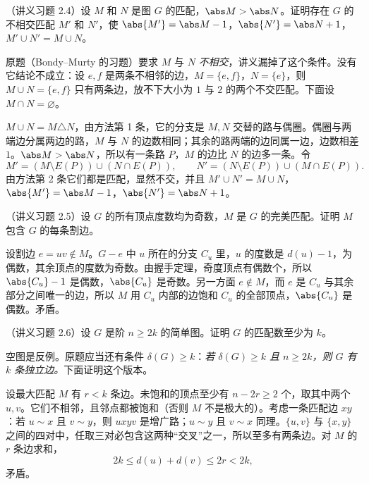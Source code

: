 \begin{workedexample}\label{we:augmenting-paths:exchange}
（讲义习题 2.4）设 $M$ 和 $N$ 是图 $G$ 的匹配，$\abs M>\abs N$。证明存在 $G$ 的不相交匹配 $M'$ 和 $N'$，使 $\abs{M'}=\abs M-1$，$\abs{N'}=\abs N+1$，$M'\cup N'=M\cup N$。
\end{workedexample}
\begin{remark}[讲义原题有误]
原题（Bondy--Murty 的习题）要求 $M$ 与 $N$ \emph{不相交}，讲义漏掉了这个条件。没有它结论不成立：设 $e,f$ 是两条不相邻的边，$M=\{e,f\}$，$N=\{e\}$，则 $M\cup N=\{e,f\}$ 只有两条边，放不下大小为 $1$ 与 $2$ 的两个不交匹配。下面设 $M\cap N=\varnothing$。
\end{remark}
\begin{solution}
$M\cup N=M\triangle N$，由方法第 1 条，它的分支是 $M,N$ 交替的路与偶圈。偶圈与两端边分属两边的路，$M$ 与 $N$ 的边数相同；其余的路两端的边同属一边，边数相差 $1$。$\abs M>\abs N$，所以有一条路 $P$，$M$ 的边比 $N$ 的边多一条。令
\[
M'=(M\setminus E(P))\cup(N\cap E(P)),\qquad N'=(N\setminus E(P))\cup(M\cap E(P)).
\]
由方法第 2 条它们都是匹配，显然不交，并且 $M'\cup N'=M\cup N$，$\abs{M'}=\abs M-1$，$\abs{N'}=\abs N+1$。
\end{solution}

\begin{workedexample}\label{we:augmenting-paths:bridges}
（讲义习题 2.5）设 $G$ 的所有顶点度数均为奇数，$M$ 是 $G$ 的完美匹配。证明 $M$ 包含 $G$ 的每条割边。
\end{workedexample}
\begin{solution}
设割边 $e=uv\notin M$。$G-e$ 中 $u$ 所在的分支 $C_u$ 里，$u$ 的度数是 $d(u)-1$，为偶数，其余顶点的度数为奇数。由握手定理，奇度顶点有偶数个，所以 $\abs{C_u}-1$ 是偶数，$\abs{C_u}$ 是奇数。另一方面 $e\notin M$，而 $e$ 是 $C_u$ 与其余部分之间唯一的边，所以 $M$ 用 $C_u$ 内部的边饱和 $C_u$ 的全部顶点，$\abs{C_u}$ 是偶数。矛盾。
\end{solution}

\begin{workedexample}\label{we:augmenting-paths:lower-bound}
（讲义习题 2.6）设 $G$ 是阶 $n\geqslant2k$ 的简单图。证明 $G$ 的匹配数至少为 $k$。
\end{workedexample}
\begin{remark}[讲义原题有误]
空图是反例。原题应当还有条件 $\delta(G)\geqslant k$：\emph{若 $\delta(G)\geqslant k$ 且 $n\geqslant2k$，则 $G$ 有 $k$ 条独立边。}下面证明这个版本。
\end{remark}
\begin{solution}
设最大匹配 $M$ 有 $r<k$ 条边。未饱和的顶点至少有 $n-2r\geqslant2$ 个，取其中两个 $u,v$。它们不相邻，且邻点都被饱和（否则 $M$ 不是极大的）。考虑一条匹配边 $xy$：若 $u\sim x$ 且 $v\sim y$，则 $uxyv$ 是增广路；$u\sim y$ 且 $v\sim x$ 同理。$\{u,v\}$ 与 $\{x,y\}$ 之间的四对中，任取三对必包含这两种“交叉”之一，所以至多有两条边。对 $M$ 的 $r$ 条边求和，
\[
2k\leqslant d(u)+d(v)\leqslant2r<2k,
\]
矛盾。
\end{solution}

